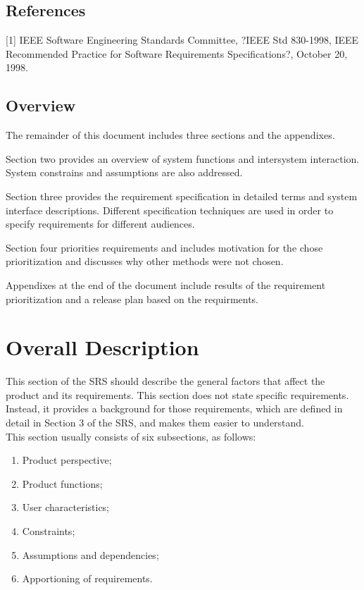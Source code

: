 \documentclass[draftclsnofoot,onecolumn,10pt]{IEEEtran}
\begin{document}
\subsection{References} %
[1] IEEE Software Engineering Standards Committee, ?IEEE Std 830-1998, IEEE 
Recommended Practice for Software Requirements Specifications?, October 20, 1998.

\subsection{Overview} %
The remainder of this document includes three sections and the appendixes. \par
Section two provides an overview of system functions and intersystem interaction. 
System constrains and assumptions are also addressed. \par
Section three provides the requirement specification in detailed terms and system 
interface descriptions. Different specification techniques are used in order to specify 
requirements for different audiences. \par
Section four priorities requirements and includes motivation for the chose prioritization 
and discusses why other methods were not chosen. \par
Appendixes at the end of the document include results of the requirement prioritization 
and a release plan based on the requirments.

\section{Overall Description}

This section of the SRS should describe the general factors that affect the
product and its requirements. This section does not state specific requirements.
Instead, it provides a background for those requirements, which are defined in
detail in Section 3 of the SRS, and makes them easier to understand.\\
This section usually consists of six subsections, as follows:
\begin{enumerate}
	\item Product perspective;
	\item Product functions;
	\item User characteristics;
	\item Constraints;
	\item Assumptions and dependencies;
	\item Apportioning of requirements.
\end{enumerate}
\end{document}
